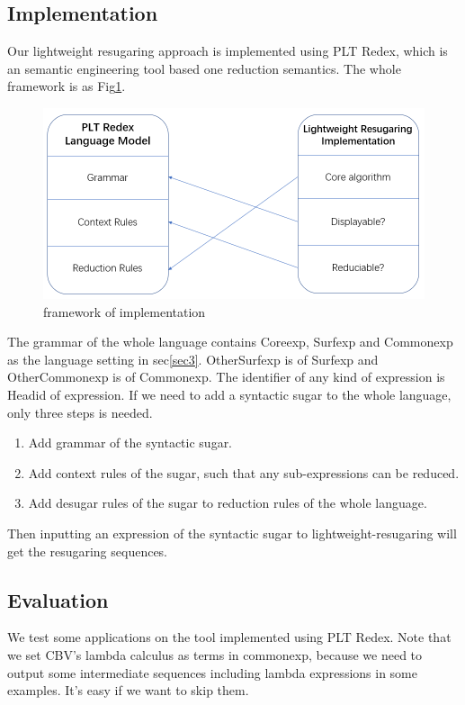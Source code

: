 \subsection{Implementation}

Our lightweight resugaring approach  is implemented using PLT Redex\cite{SEwPR}, which is an semantic engineering tool based one reduction semantics\cite{reduction}. The whole framework is as Fig\ref{fig:frame}.

\begin{figure}[h]
	\centering
	\includegraphics[width=12cm]{images/frame.png}
	\caption{framework of implementation}
	\label{fig:frame}
\end{figure}

The grammar of the whole language contains Coreexp, Surfexp and Commonexp as the language setting in sec\ref{sec3}. OtherSurfexp is of Surfexp and OtherCommonexp is of Commonexp. The identifier of any kind of expression is Headid of expression. If we need to add a syntactic sugar to the whole language, only three steps is needed.

\begin{enumerate}
\item Add grammar of the syntactic sugar.
\item Add context rules of the sugar, such that any sub-expressions can be reduced.
\item Add desugar rules of the sugar to reduction rules of the whole language.
\end{enumerate}

Then inputting an expression of the syntactic sugar to lightweight-resugaring will get the resugaring sequences.

\subsection{Evaluation}
\label{sec6}

We test some applications on the tool implemented using PLT Redex. Note that we set CBV's lambda calculus as terms in commonexp, because we need to output some intermediate sequences including lambda expressions in some examples. It's easy if we want to skip them.

